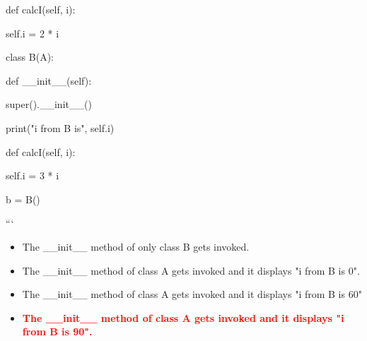 \documentclass[12pt,a4paper]{article}
\begin{document}
\newline
\newline

\newline
    def calcI(self, i):\newline

\newline
        self.i = 2 * i\newline

\newline
\newline

\newline
class B(A):\newline

\newline
    def __init__(self):\newline

\newline
        super().__init__()\newline

\newline
        print("i from B is", self.i)\newline

\newline
\newline

\newline
    def calcI(self, i):\newline

\newline
        self.i = 3 * i\newline

\newline
\newline

\newline
b = B()\newline

\newline
```

\begin{itemize}
    \item[\textbf{A.}] The __init__ method of only class B gets invoked.
    \item[\textbf{B.}] The __init__ method of class A gets invoked and it displays "i from B is 0".
    \item[\textbf{C.}] The __init__ method of class A gets invoked and it displays "i from B is 60"
    \item[\textbf{D.}] \textcolor{red}{\textbf{The __init__ method of class A gets invoked and it displays "i from B is 90".}}
\end{itemize}
\end{document}
